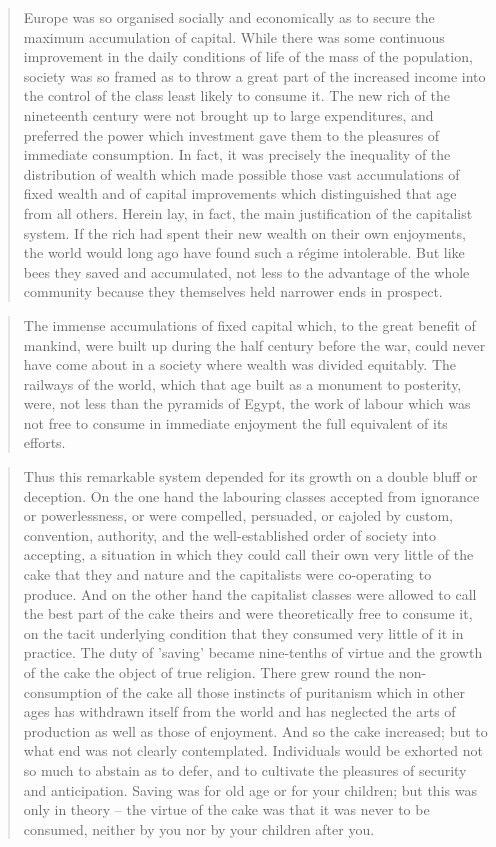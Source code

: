 \documentclass[]{book}
\theoremstyle{definition}
\theoremstyle{definition}
\theoremstyle{definition}
\theoremstyle{remark}
\begin{document}
\begin{quote}
Europe was so organised socially and economically as to secure the
maximum accumulation of capital. While there was some continuous
improvement in the daily conditions of life of the mass of the
population, society was so framed as to throw a great part of the
increased income into the control of the class least likely to consume
it. The new rich of the nineteenth century were not brought up to large
expenditures, and preferred the power which investment gave them to the
pleasures of immediate consumption. In fact, it was precisely the
inequality of the distribution of wealth which made possible those vast
accumulations of fixed wealth and of capital improvements which
distinguished that age from all others. Herein lay, in fact, the main
justification of the capitalist system. If the rich had spent their new
wealth on their own enjoyments, the world would long ago have found such
a régime intolerable. But like bees they saved and accumulated, not less
to the advantage of the whole community because they themselves held
narrower ends in prospect.
\end{quote}

\begin{quote}
The immense accumulations of fixed capital which, to the great benefit
of mankind, were built up during the half century before the war, could
never have come about in a society where wealth was divided equitably.
The railways of the world, which that age built as a monument to
posterity, were, not less than the pyramids of Egypt, the work of labour
which was not free to consume in immediate enjoyment the full equivalent
of its efforts.
\end{quote}

\begin{quote}
Thus this remarkable system depended for its growth on a double bluff or
deception. On the one hand the labouring classes accepted from ignorance
or powerlessness, or were compelled, persuaded, or cajoled by custom,
convention, authority, and the well-established order of society into
accepting, a situation in which they could call their own very little of
the cake that they and nature and the capitalists were co-operating to
produce. And on the other hand the capitalist classes were allowed to
call the best part of the cake theirs and were theoretically free to
consume it, on the tacit underlying condition that they consumed very
little of it in practice. The duty of 'saving' became nine-tenths of
virtue and the growth of the cake the object of true religion. There
grew round the non-consumption of the cake all those instincts of
puritanism which in other ages has withdrawn itself from the world and
has neglected the arts of production as well as those of enjoyment. And
so the cake increased; but to what end was not clearly contemplated.
Individuals would be exhorted not so much to abstain as to defer, and to
cultivate the pleasures of security and anticipation. Saving was for old
age or for your children; but this was only in theory -- the virtue of
the cake was that it was never to be consumed, neither by you nor by
your children after you.
\end{quote}
\end{document}
